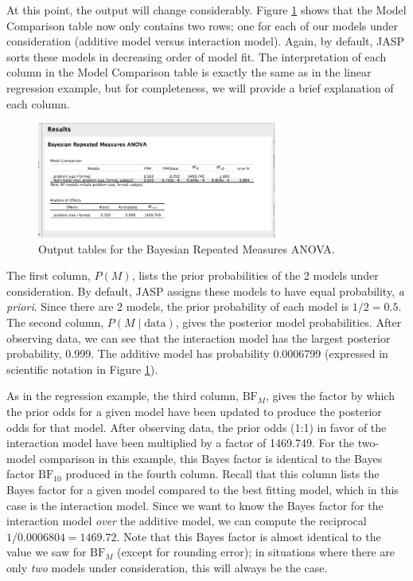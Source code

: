 \documentclass[english,,doc,floatsintext]{apa6}
\begin{document}
At this point, the output will change considerably. Figure \ref{fig:repeatedMeasures3} shows that the Model Comparison table now only contains two rows; one for each of our models under consideration (additive model versus interaction model). Again, by default, JASP sorts these models in decreasing order of model fit. The interpretation of each column in the Model Comparison table is exactly the same as in the linear regression example, but for completeness, we will provide a brief explanation of each column.

\begin{figure}
\centering
\includegraphics[width=0.7\textwidth,height=\textheight]{figures/repeatedMeasures3.png}
\caption{\label{fig:repeatedMeasures3}Output tables for the Bayesian Repeated Measures ANOVA.}
\end{figure}

The first column, \(P(M)\), lists the prior probabilities of the 2 models under consideration. By default, JASP assigns these models to have equal probability, \emph{a priori}. Since there are 2 models, the prior probability of each model is \(1/2 = 0.5\). The second column, \(P(M\mid \text{data})\), gives the posterior model probabilities. After observing data, we can see that the interaction model has the largest posterior probability, 0.999. The additive model has probability 0.0006799 (expressed in scientific notation in Figure \ref{fig:repeatedMeasures3}).

As in the regression example, the third column, \(\text{BF}_{M}\), gives the factor by which the prior odds for a given model have been updated to produce the posterior odds for that model. After observing data, the prior odds (1:1) in favor of the interaction model have been multiplied by a factor of 1469.749. For the two-model comparison in this example, this Bayes factor is identical to the Bayes factor \(\text{BF}_{10}\) produced in the fourth column. Recall that this column lists the Bayes factor for a given model compared to the best fitting model, which in this case is the interaction model. Since we want to know the Bayes factor for the interaction model \emph{over} the additive model, we can compute the reciprocal \(1/0.0006804 = 1469.72\). Note that this Bayes factor is almost identical to the value we saw for \(\text{BF}_{M}\) (except for rounding error); in situations where there are only \emph{two} models under consideration, this will always be the case.
\end{document}
